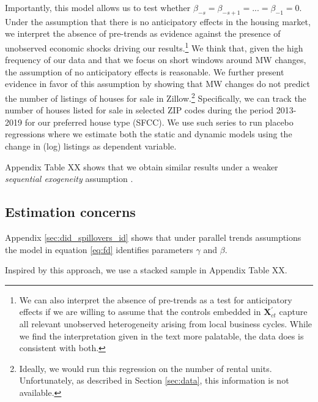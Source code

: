 Importantly, this model allows us to test whether $\beta_{-s} = \beta_{-s+1} = ... = \beta_{-1} 
= 0$. Under the assumption that there is no anticipatory effects in the housing market, we 
interpret the absence of pre-trends as evidence against the presence of unobserved economic 
shocks driving our results.\footnote{We can also interpret the absence of pre-trends as a test 
	for anticipatory effects if we are willing to assume that the controls embedded in 
	$\mathbf{X}^{'}_{ct}$ capture all relevant unobserved heterogeneity arising from local 
	business cycles. While we find the interpretation given in the text more palatable, the 
	data does is consistent with both.}
We think that, given the high frequency of our data and that we focus on short windows around MW 
changes, the assumption of no anticipatory effects is reasonable. We further present evidence in 
favor of this assumption by showing that MW changes do not predict the number of listings of 
houses for sale in Zillow.\footnote{Ideally, we would run this regression on the number of rental 
	units. Unfortunately, as described in Section \ref{sec:data}, this information is not available.}
Specifically, we can track the number of houses listed for sale in selected ZIP codes during the 
period 2013-2019 for our preferred house type (SFCC). We use such series to run placebo 
regressions where we estimate both the static and dynamic models using the change in (log) 
listings as dependent variable. %

Appendix Table XX shows that we obtain similar results under a weaker 
\textit{sequential exogeneity} assumption \parencite{ArellanoHonore2001}.


\subsection{Estimation concerns}

Appendix \ref{sec:did_spillovers_id} shows that under parallel trends assumptions
the model in equation \ref{eq:fd} identifies parameters $\gamma$ and $\beta$.

Inspired by this approach, we use a stacked sample in Appendix Table XX.

